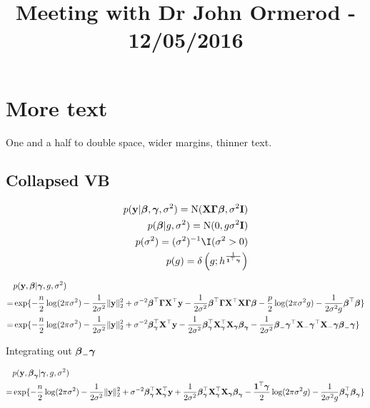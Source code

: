 \documentclass{amsart}
\title{Meeting with Dr John Ormerod - 12/05/2016}
\begin{document}
\maketitle

\section{More text}
One and a half to double space, wider margins, thinner text.

\subsection{Collapsed VB}

\begin{align*}
p(\vy|\vbeta, \vgamma, \sigma^2) = \N(\mX \mGamma \vbeta, \sigma^2 \mI) \\
p(\vbeta|g, \sigma^2) = \N(0, g \sigma^2 \mI) \\
p(\sigma^2) = (\sigma^2)^{-1} \I(\sigma^2 > 0) \\
p(g) = \delta \left ( g ;h^{\frac{1}{\vone^\top \vgamma}} \right ) \\
\end{align*}

\begin{align*}
&p({\bf y}, {\boldsymbol \beta} | {\boldsymbol \gamma}, g, \sigma^2) \\
=& \exp\{-\frac{n}{2} \log(2 \pi \sigma^2) - \frac{1}{2 \sigma^2}\|{\bf y}\|_2^2 + \sigma^{-2} {\boldsymbol \beta}^\top {\boldsymbol\Gamma} {\bf X}^\top {\bf y}
			- \frac{1}{2 \sigma^2} {\boldsymbol \beta}^\top {\boldsymbol\Gamma} {\bf X}^\top {\bf X} {\boldsymbol\Gamma} {\boldsymbol\beta} -\frac{p}{2} \log(2 \pi \sigma^2 g)
			- \frac{1}{2 \sigma^2 g} {\boldsymbol \beta}^\top {\boldsymbol\beta}\} \\
=& \exp\{-\frac{n}{2} \log(2 \pi \sigma^2) - \frac{1}{2 \sigma^2} \|{\bf y}\|_2^2 + \sigma^{-2} {\boldsymbol \beta}_{\boldsymbol \gamma}^\top {\bf X}^\top {\bf y}
			-\frac{1}{2 \sigma^2} {\boldsymbol \beta}_{\boldsymbol \gamma}^\top {\bf X}_{\boldsymbol \gamma}^\top {\bf X}_{\boldsymbol \gamma} {\boldsymbol \beta}_{\boldsymbol \gamma}
			-\frac{1}{2 \sigma^2} {\boldsymbol \beta}_-{\boldsymbol \gamma}^\top {\bf X}_-{\boldsymbol \gamma}^\top {\bf X}_-{\boldsymbol \gamma} {\boldsymbol \beta}_-{\boldsymbol \gamma}\}
\end{align*}

Integrating out ${\boldsymbol \beta}_-{\boldsymbol \gamma}$

\begin{align*}
&p({\bf y}, {\boldsymbol \beta}_{\boldsymbol \gamma} | {\boldsymbol \gamma}, g, \sigma^2) \\
=& \exp\{-\frac{n}{2} \log(2 \pi \sigma^2) -\frac{1}{2 \sigma^2} \|{\bf y}\|_2^2 + \sigma^{-2} {\boldsymbol \beta}_{\boldsymbol \gamma}^\top {\bf X}_{\boldsymbol \gamma}^\top {\bf y}
			+ \frac{1}{2 \sigma^2} {\boldsymbol \beta}_{\boldsymbol \gamma}^\top {\bf X}_{\boldsymbol \gamma}^\top {\bf X}_{\boldsymbol \gamma} {\boldsymbol \beta}_{\boldsymbol \gamma}
			- \frac{{\bf 1}^\top {\boldsymbol\gamma}}{2} \log(2 \pi \sigma^2 g) - \frac{1}{2 \sigma^2 g} {\boldsymbol \beta}_{\boldsymbol \gamma}^\top {\boldsymbol\beta}_{\boldsymbol \gamma}\}
\end{align*}
\end{document}

